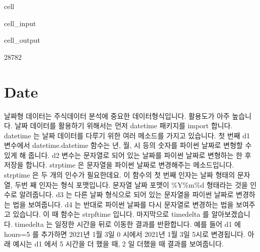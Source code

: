 \documentclass[letterpaper,10pt,english]{jupyterBook}
\begin{document}
\begin{sphinxuseclass}{cell}\begin{sphinxVerbatimInput}

\begin{sphinxuseclass}{cell_input}
\begin{sphinxVerbatim}[commandchars=\\\{\}]
  
  
\end{sphinxVerbatim}

\end{sphinxuseclass}\end{sphinxVerbatimInput}
\begin{sphinxVerbatimOutput}

\begin{sphinxuseclass}{cell_output}
\begin{sphinxVerbatim}[commandchars=\\\{\}]
28782
\end{sphinxVerbatim}

\end{sphinxuseclass}\end{sphinxVerbatimOutput}

\end{sphinxuseclass}

\section{Date}
\label{\detokenize{chapter2/2.1.1_Python_Basics:date}}
\sphinxAtStartPar
날짜형 데이터는 주식데이터 분석에 중요한 데이터형식입니다. 활용도가 아주 높습니다. 날짜 데이터를 활용하기 위해서는 먼저 datetime 패키지를 import 합니다. datetime 는 날짜 데이터를 다루기 위한 여러 메소드를 가지고 있습니다. 첫 번째 d1 변수에서 datetime.datetime 함수는 년, 월, 시 등의 숫자를 파이썬 날짜로 변형할 수 있게 해 줍니다. d2 변수는 문자열로 되어 있는 날짜를 파이썬 날짜로 변형하는 한 후 저장을 합니다. strptime 은 문자열을 파이썬 날짜로 변경해주는 메소드입니다. strptime 은 두 개의 인수가 필요한데요. 이 함수의 첫 번째 인자는 날짜 형태의 문자열, 두번 째 인자는 형식 포맷입니다. 문자열 날짜 포맷이 \%Y\sphinxhyphen{}\%m\sphinxhyphen{}\%d 형태라는 것을 인수로 알려줍니다. d3 는 다른 날짜 형식으로 되어 있는 문자열을 파이썬 날짜로 변경하는 법을 보여줍니다. d4 는 반대로 파이썬 날짜를 다시 문자열로 변경하는 법을 보여주고 있습니다. 이 때 함수는 strpftime 입니다. 마지막으로 timedelta 를 알아보겠습니다. timedelta 는 일정한 시간을 뒤로 이동한 결과를 반환합니다. 예를 들어 d1 에 hours=5 를 추가하면 2021년 1월 3일 0 시에서 2021년 1월 3일 5시로 변경됩니다. 아래 예시는 d1 에서 5 시간을 더 했을 때, 2 일 더했을 때 결과를 보여줍니다.
\end{document}
